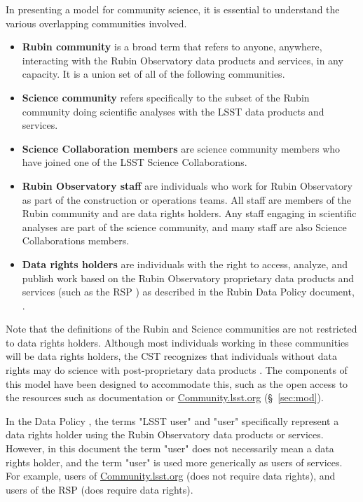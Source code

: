 \documentclass[DM,authoryear,toc]{lsstdoc}
\begin{document}
In presenting a model for community science, it is essential to understand the various overlapping communities involved.

\begin{itemize}
\item \textbf{Rubin community} is a broad term that refers to anyone, anywhere, interacting with the Rubin Observatory data products and services, in any capacity. It is a union set of all of the following communities.
\item \textbf{Science community} refers specifically to the subset of the Rubin community doing scientific analyses with the LSST data products and services.
\item \textbf{Science Collaboration members} are science community members who have joined one of the LSST Science Collaborations.
\item \textbf{Rubin Observatory staff} are individuals who work for Rubin Observatory as part of the construction or operations teams. All staff are members of the Rubin community and are data rights holders. Any staff engaging in scientific analyses are part of the science community, and many staff are also Science Collaborations members.
\item \textbf{Data rights holders} are individuals with the right to access, analyze, and publish work based on the Rubin Observatory proprietary data products and services (such as the RSP ) as described in the Rubin Data Policy document, . 
\end{itemize}

Note that the definitions of the Rubin and Science communities are not restricted to data rights holders. 
Although most individuals working in these communities will be data rights holders, the CST recognizes that individuals without data rights may do science with post-proprietary data products .
The components of this model have been designed to accommodate this, such as the open access to the resources such as documentation or \url{Community.lsst.org} (\S~\ref{sec:mod}).

In the Data Policy , the terms "LSST user" and "user" specifically represent a data rights holder using the Rubin Observatory data products or services. 
However, in this document the term "user" does not necessarily mean a data rights holder, and the term "user" is used more generically as users of services.
For example, users of \url{Community.lsst.org} (does not require data rights), and users of the RSP (does require data rights).
\end{document}
